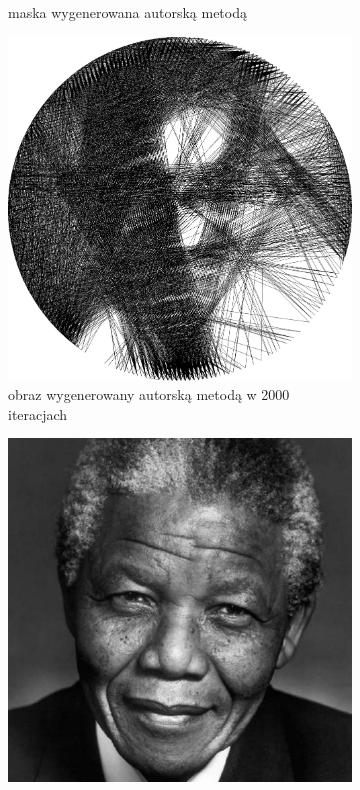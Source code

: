 \documentclass[a4paper, 12pt, polish, twoside]{extreport}
\begin{document}
\begin{figure}[H]
\begin{subfigure}{0.24\textwidth}
        \caption{maska wygenerowana autorską metodą}
        \label{comp-comp-gandhi-mandela-c}
    \end{subfigure}
    \begin{subfigure}{0.24\textwidth}
        \centering
        \includegraphics[width = \textwidth]{img/6-comp/gandhi_e_i2000_c20_inv0_bg10_obj1_ed10.png}
        \caption{obraz wygenerowany autorską metodą w 2000 iteracjach}
        \label{comp-comp-gandhi-mandela-d}
    \end{subfigure}
    \begin{subfigure}{0.24\textwidth}
        \centering
        \includegraphics[width = \textwidth]{img/6-comp/mandela_original_c10_inv0.png}

\end{subfigure}
\end{figure}
\end{document}
